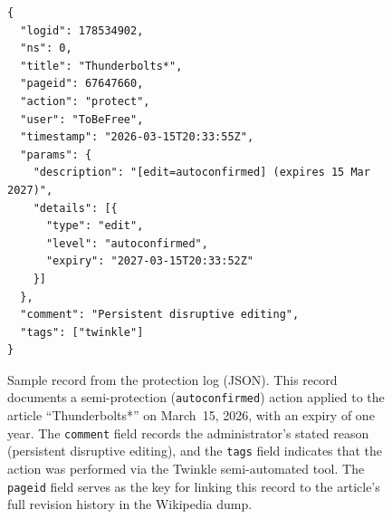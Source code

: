 \documentclass[11pt]{article}
\begin{document}
\begin{figure}[ht]
\centering
\small
\singlespacing
\begin{verbatim}
{
  "logid": 178534902,
  "ns": 0,
  "title": "Thunderbolts*",
  "pageid": 67647660,
  "action": "protect",
  "user": "ToBeFree",
  "timestamp": "2026-03-15T20:33:55Z",
  "params": {
    "description": "[edit=autoconfirmed] (expires 15 Mar 2027)",
    "details": [{
      "type": "edit",
      "level": "autoconfirmed",
      "expiry": "2027-03-15T20:33:52Z"
    }]
  },
  "comment": "Persistent disruptive editing",
  "tags": ["twinkle"]
}
\end{verbatim}
\caption{Sample record from the protection log (JSON). This record documents a semi-protection (\texttt{autoconfirmed}) action applied to the article ``Thunderbolts*'' on March~15, 2026, with an expiry of one year. The \texttt{comment} field records the administrator's stated reason (persistent disruptive editing), and the \texttt{tags} field indicates that the action was performed via the Twinkle semi-automated tool. The \texttt{pageid} field serves as the key for linking this record to the article's full revision history in the Wikipedia dump.}
\label{fig:sample}
\end{figure}
\end{document}
